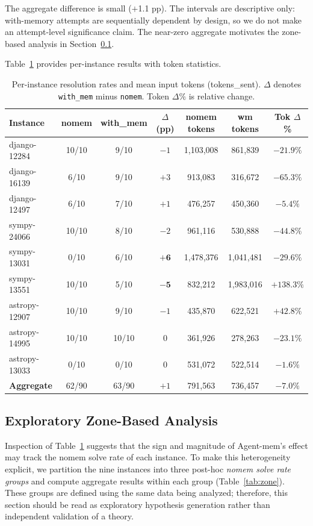 \documentclass[runningheads]{llncs}
\begin{document}
The aggregate difference is small ($+$1.1 pp). The intervals are descriptive only: with-memory attempts are sequentially dependent by design, so we do not make an attempt-level significance claim. The near-zero aggregate motivates the zone-based analysis in Section~\ref{sec:zone}.

Table~\ref{tab:per_instance} provides per-instance results with token statistics.

\begin{table}[h]
\centering
\caption{Per-instance resolution rates and mean input tokens (tokens\_sent). $\Delta$ denotes \texttt{with\_mem} minus \texttt{nomem}. Token $\Delta\%$ is relative change.}
\label{tab:per_instance}
\setlength{\tabcolsep}{5pt}
\begin{tabular}{lcccccc}
\toprule
\textbf{Instance} & \textbf{nomem} & \textbf{with\_mem} & \textbf{$\Delta$ (pp)} & \textbf{nomem tokens} & \textbf{wm tokens} & \textbf{Tok $\Delta$\%} \\
\midrule
django-12284 & 10/10 & 9/10 & $-1$ & 1,103,008 & 861,839 & $-21.9\%$ \\
django-16139 & 6/10 & 9/10 & $+3$ & 913,083 & 316,672 & $-65.3\%$ \\
django-12497 & 6/10 & 7/10 & $+1$ & 476,257 & 450,360 & $-5.4\%$ \\
sympy-24066 & 10/10 & 8/10 & $-2$ & 961,116 & 530,888 & $-44.8\%$ \\
sympy-13031 & 0/10 & 6/10 & $\mathbf{+6}$ & 1,478,376 & 1,041,481 & $-29.6\%$ \\
sympy-13551 & 10/10 & 5/10 & $\mathbf{-5}$ & 832,212 & 1,983,016 & $+138.3\%$ \\
astropy-12907 & 10/10 & 9/10 & $-1$ & 435,870 & 622,521 & $+42.8\%$ \\
astropy-14995 & 10/10 & 10/10 & $0$ & 361,926 & 278,263 & $-23.1\%$ \\
astropy-13033 & 0/10 & 0/10 & $0$ & 531,072 & 522,514 & $-1.6\%$ \\
\midrule
\textbf{Aggregate} & 62/90 & 63/90 & $+1$ & 791,563 & 736,457 & $-7.0\%$ \\
\bottomrule
\end{tabular}
\end{table}

\subsection{Exploratory Zone-Based Analysis}
\label{sec:zone}

Inspection of Table~\ref{tab:per_instance} suggests that the sign and magnitude of Agent-mem's effect may track the nomem solve rate of each instance. To make this heterogeneity explicit, we partition the nine instances into three post-hoc \emph{nomem solve rate groups} and compute aggregate results within each group (Table~\ref{tab:zone}). These groups are defined using the same data being analyzed; therefore, this section should be read as exploratory hypothesis generation rather than independent validation of a theory.
\end{document}
